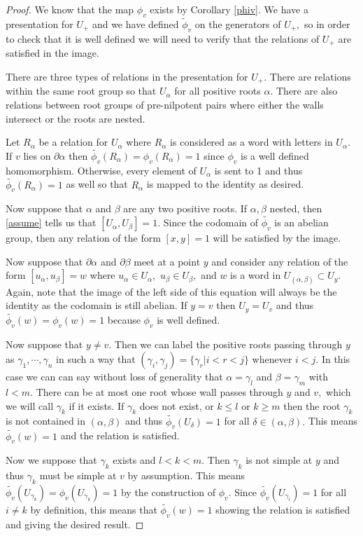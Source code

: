 \documentclass[class=book, crop=false,12 pt]{standalone}
\begin{document}
\begin{proof}
	We know that the map $\phi_v$ exists by Corollary \ref{phiv}. We have a presentation for $U_+$ and we have defined $\tilde{\phi}_v$ on the generators of $U_+,$ so in order to check that it is well defined we will need to verify that the relations of $U_+$ are satisfied in the image.

	There are three types of relations in the presentation for $U_+.$ There are relations within the same root group so that $U_\alpha$ for all positive roots $\alpha.$ There are also relations between root groups of pre-nilpotent pairs where either the walls intersect or the roots are nested.

	Let $R_\alpha$ be a relation for $U_\alpha$ where $R_\alpha$ is considered as a word with letters in $U_\alpha.$ If $v$ lies on $\partial \alpha$ then $\tilde{\phi_v}(R_\alpha)=\phi_v(R_\alpha)=1$ since $\phi_v$ is a well defined homomorphism. Otherwise, every element of $U_\alpha$ is sent to 1 and thus $\tilde{\phi_v}(R_\alpha)=1$ as well so that $R_\alpha$ is mapped to the identity as desired.

	Now suppose that $\alpha$ and $\beta$ are any two positive roots. If $\alpha,\beta$ nested, then \eqref{assume} tells us that $[U_\alpha,U_\beta]=1.$ Since the codomain of $\tilde{\phi_v}$ is an abelian group, then any relation of the form $[x,y]=1$ will be satisfied by the image.


	Now suppose that $\partial \alpha$ and $\partial \beta$ meet at a point $y$ and consider any relation of the form $[u_\alpha,u_\beta]=w$ where $u_\alpha\in U_\alpha,$ $u_\beta\in U_\beta,$ and $w$ is a word in $U_{(\alpha,\beta)}\subset U_y.$ Again, note that the image of the left side of this equation will always be the identity as the codomain is still abelian. If $y=v$ then $U_y=U_v$ and thus $\tilde{\phi_v}(w)=\phi_v(w)=1$ because $\phi_v$ is well defined.

	Now suppose that $y\neq v.$ Then we can label the positive roots passing through $y$ as $\gamma_1,\cdots,\gamma_n$ in such a way that $(\gamma_i,\gamma_j)=\{\gamma_{r}|i<r<j\}$ whenever $i<j.$ In this case we can can say without loss of generality that $\alpha=\gamma_l$ and $\beta=\gamma_m$ with $l<m.$  There can be at most one root whose wall passes through $y$ and $v,$ which we will call $\gamma_k$ if it exists. If $\gamma_k$ does not exist, or $k\le l$ or $k\ge m$ then the root $\gamma_k$ is not contained in $(\alpha,\beta)$ and thus $\tilde{\phi_v}(U_\delta)=1$ for all $\delta\in (\alpha,\beta).$ This means $\tilde{\phi_v}(w)=1$ and the relation is satisfied.

	Now we suppose that $\gamma_k$ exists and $l<k<m.$ Then $\gamma_k$ is not simple at $y$ and thus $\gamma_k$ must be simple at $v$ by assumption. This means $\tilde{\phi_v}(U_{\gamma_k})=\phi_v(U_{\gamma_k})=1$ by the construction of $\phi_v.$ Since $\tilde{\phi_v}(U_{\gamma_i})=1$ for all $i\neq k$ by definition, this means that $\tilde{\phi_v}(w)=1$ showing the relation is satisfied and giving the desired result.
\end{proof}
\end{document}
